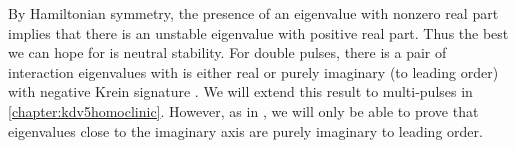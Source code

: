 \documentclass[thesis.tex]{subfiles}
\begin{document}
\noi By Hamiltonian symmetry, the presence of an eigenvalue with nonzero real part implies that there is an unstable eigenvalue with positive real part. Thus the best we can hope for is neutral stability. For double pulses, there is a pair of interaction eigenvalues with is either real or purely imaginary (to leading order) with negative Krein signature \cite[Theorem 2.3]{Pelinovsky2007}. We will extend this result to multi-pulses in \cref{chapter:kdv5homoclinic}. However, as in \cite{Pelinovsky2007}, we will only be able to prove that eigenvalues close to the imaginary axis are purely imaginary to leading order.

\iffulldocument\else
	
	
\fi
\end{document}

